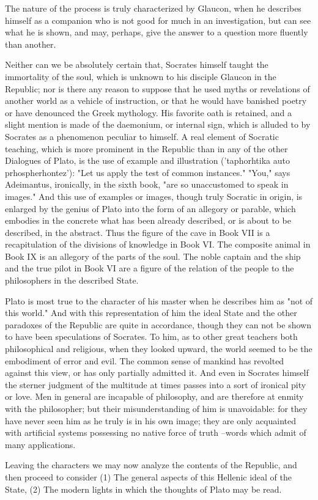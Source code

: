 The nature of the process is truly characterized by Glaucon, when he describes himself as a companion who is not good for much in an investigation, but can see what he is shown, and may, perhaps, give the answer to a question more fluently than another.

Neither can we be absolutely certain that, Socrates himself taught the immortality of the soul, which is unknown to his disciple Glaucon in the Republic; nor is there any reason to suppose that he used myths or revelations of another world as a vehicle of instruction, or that he would have banished poetry or have denounced the Greek mythology. His favorite oath is retained, and a slight mention is made of the daemonium, or internal sign, which is alluded to by Socrates as a phenomenon peculiar to himself. A real element of Socratic teaching, which is more prominent in the Republic than in any of the other Dialogues of Plato, is the use of example and illustration ('taphorhtika auto prhospherhontez'): "Let us apply the test of common instances." "You," says Adeimantus, ironically, in the sixth book, "are so unaccustomed to speak in images." And this use of examples or images, though truly Socratic in origin, is enlarged by the genius of Plato into the form of an allegory or parable, which embodies in the concrete what has been already described, or is about to be described, in the abstract. Thus the figure of the cave in Book VII is a recapitulation of the divisions of knowledge in Book VI. The composite animal in Book IX is an allegory of the parts of the soul. The noble captain and the ship and the true pilot in Book VI are a figure of the relation of the people to the philosophers in the described State.

Plato is most true to the character of his master when he describes him as "not of this world." And with this representation of him the ideal State and the other paradoxes of the Republic are quite in accordance, though they can not be shown to have been speculations of Socrates. To him, as to other great teachers both philosophical and religious, when they looked upward, the world seemed to be the embodiment of error and evil. The common sense of mankind has revolted against this view, or has only partially admitted it. And even in Socrates himself the sterner judgment of the multitude at times passes into a sort of ironical pity or love. Men in general are incapable of philosophy, and are therefore at enmity with the philosopher; but their misunderstanding of him is unavoidable: for they have never seen him as he truly is in his own image; they are only acquainted with artificial systems possessing no native force of truth --words which admit of many applications.

Leaving the characters we may now analyze the contents of the Republic, and then proceed to consider (1) The general aspects of this Hellenic ideal of the State, (2) The modern lights in which the thoughts of Plato may be read.
